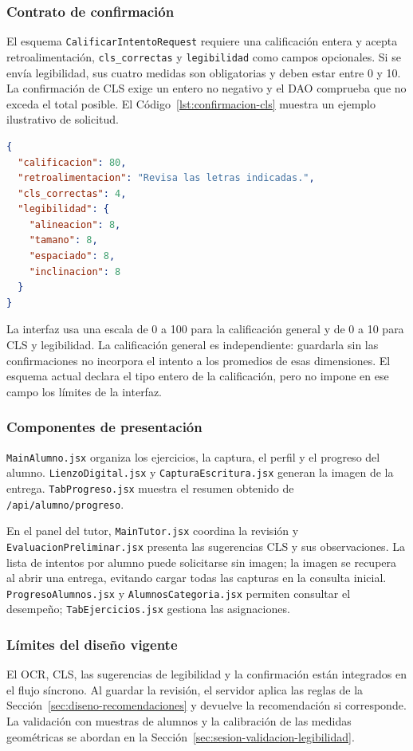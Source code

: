 \subsubsection{Contrato de confirmación}
El esquema \texttt{CalificarIntentoRequest} requiere una calificación entera y acepta retroalimentación, \texttt{cls\_correctas} y \texttt{legibilidad} como campos opcionales. Si se envía legibilidad, sus cuatro medidas son obligatorias y deben estar entre 0 y 10. La confirmación de CLS exige un entero no negativo y el DAO comprueba que no exceda el total posible. El Código~\ref{lst:confirmacion-cls} muestra un ejemplo ilustrativo de solicitud.

\noindent\begin{minipage}{\linewidth}
\begin{lstlisting}[language=JSON, caption={Solicitud de revisión del intento}, label={lst:confirmacion-cls}]
{
  "calificacion": 80,
  "retroalimentacion": "Revisa las letras indicadas.",
  "cls_correctas": 4,
  "legibilidad": {
    "alineacion": 8,
    "tamano": 8,
    "espaciado": 8,
    "inclinacion": 8
  }
}
\end{lstlisting}
\end{minipage}

La interfaz usa una escala de 0 a 100 para la calificación general y de 0 a 10 para CLS y legibilidad. La calificación general es independiente: guardarla sin las confirmaciones no incorpora el intento a los promedios de esas dimensiones. El esquema actual declara el tipo entero de la calificación, pero no impone en ese campo los límites de la interfaz.

\subsubsection{Componentes de presentación}
\texttt{MainAlumno.jsx} organiza los ejercicios, la captura, el perfil y el progreso del alumno. \texttt{LienzoDigital.jsx} y \texttt{CapturaEscritura.jsx} generan la imagen de la entrega. \texttt{TabProgreso.jsx} muestra el resumen obtenido de \texttt{/api/alumno/progreso}.

En el panel del tutor, \texttt{MainTutor.jsx} coordina la revisión y \texttt{EvaluacionPreliminar.jsx} presenta las sugerencias CLS y sus observaciones. La lista de intentos por alumno puede solicitarse sin imagen; la imagen se recupera al abrir una entrega, evitando cargar todas las capturas en la consulta inicial. \texttt{ProgresoAlumnos.jsx} y \texttt{AlumnosCategoria.jsx} permiten consultar el desempeño; \texttt{TabEjercicios.jsx} gestiona las asignaciones.

\subsubsection{Límites del diseño vigente}
El OCR, CLS, las sugerencias de legibilidad y la confirmación están integrados en el flujo síncrono. Al guardar la revisión, el servidor aplica las reglas de la Sección~\ref{sec:diseno-recomendaciones} y devuelve la recomendación si corresponde. La validación con muestras de alumnos y la calibración de las medidas geométricas se abordan en la Sección~\ref{sec:sesion-validacion-legibilidad}.
